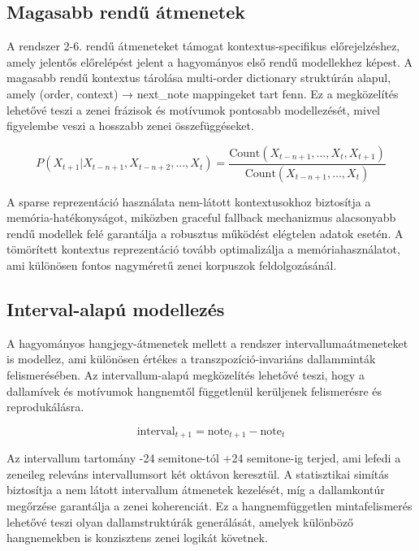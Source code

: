 \subsection{Magasabb rendű átmenetek}

A rendszer 2-6. rendű átmeneteket támogat kontextus-specifikus előrejelzéshez, amely jelentős előrelépést jelent a hagyományos első rendű modellekhez képest. A magasabb rendű kontextus tárolása multi-order dictionary struktúrán alapul, amely (order, context) → next_note mappingeket tart fenn. Ez a megközelítés lehetővé teszi a zenei frázisok és motívumok pontosabb modellezését, mivel figyelembe veszi a hosszabb zenei összefüggéseket.

\begin{equation}
P(X_{t+1} | X_{t-n+1}, X_{t-n+2}, \ldots, X_t) = \frac{\text{Count}(X_{t-n+1}, \ldots, X_t, X_{t+1})}{\text{Count}(X_{t-n+1}, \ldots, X_t)}
\end{equation}

A sparse reprezentáció használata nem-látott kontextusokhoz biztosítja a memória-hatékonyságot, miközben graceful fallback mechanizmus alacsonyabb rendű modellek felé garantálja a robusztus működést elégtelen adatok esetén. A tömörített kontextus reprezentáció tovább optimalizálja a memóriahasználatot, ami különösen fontos nagyméretű zenei korpuszok feldolgozásánál.

\subsection{Interval-alapú modellezés}

A hagyományos hangjegy-átmenetek mellett a rendszer intervallumaátmeneteket is modellez, ami különösen értékes a transzpozíció-invariáns dallamminták felismerésében. Az intervallum-alapú megközelítés lehetővé teszi, hogy a dallamívek és motívumok hangnemtől függetlenül kerüljenek felismerésre és reprodukálásra.

\begin{equation}
\text{interval}_{t+1} = \text{note}_{t+1} - \text{note}_t
\end{equation}

Az intervallum tartomány -24 semitone-tól +24 semitone-ig terjed, ami lefedi a zeneileg releváns intervallumsort két oktávon keresztül. A statisztikai simítás biztosítja a nem látott intervallum átmenetek kezelését, míg a dallamkontúr megőrzése garantálja a zenei koherenciát. Ez a hangnemfüggetlen mintafelismerés lehetővé teszi olyan dallamstruktúrák generálását, amelyek különböző hangnemekben is konzisztens zenei logikát követnek.

